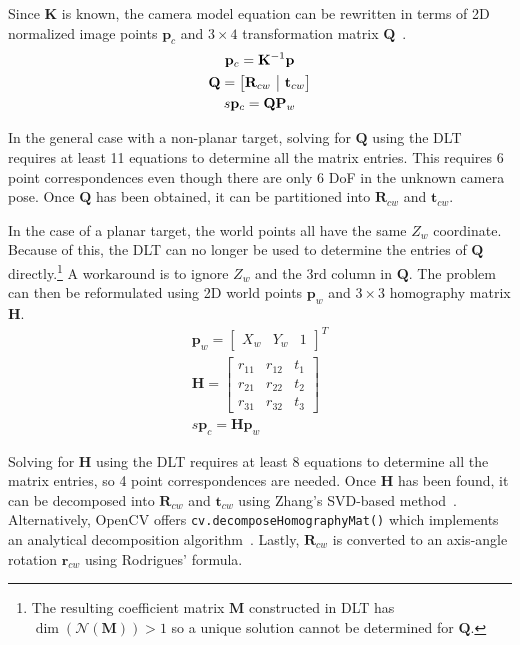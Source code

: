 \documentclass{article}
\makeatletter
\newcommand{\onebytwo}[2]{\ensuremath{\left[\begin{array}{@{}c|c@{}} #1 & #2 \end{array}\right]}}
\makeatother
\begin{document}
Since $\mathbf{K}$ is known, the camera model equation can be rewritten in terms of 2D normalized image points $\mathbf{p}_c$ and $3 \times 4$ transformation matrix $\mathbf{Q}$~\cite{dlt}.
\begin{gather*}
    \mathbf{p}_c=\mathbf{K}^{-1}\mathbf{p} \\
    \mathbf{Q}=\onebytwo{\mathbf{R}_{cw}}{\mathbf{t}_{cw}} \\
    s\mathbf{p}_c=\mathbf{Q}\mathbf{P}_w
\end{gather*}

In the general case with a non-planar target, solving for $\mathbf{Q}$ using the DLT requires at least 11 equations to determine all the matrix entries. This requires 6 point correspondences even though there are only 6 DoF in the unknown camera pose.\footnotemark{} Once $\mathbf{Q}$ has been obtained, it can be partitioned into $\mathbf{R}_{cw}$ and $\mathbf{t}_{cw}$.


In the case of a planar target, the world points all have the same $Z_w$ coordinate. Because of this, the DLT can no longer be used to determine the entries of $\mathbf{Q}$ directly.\footnote{The resulting coefficient matrix $\mathbf{M}$ constructed in DLT has $\dim (\mathcal{N} ( \mathbf{M} ) ) > 1$ so a unique solution cannot be determined for $\mathbf{Q}$.} A workaround is to ignore $Z_w$ and the 3rd column in $\mathbf{Q}$. The problem can then be reformulated using 2D world points $\mathbf{p}_w$ and $3 \times 3$ homography matrix $\mathbf{H}$.
\begin{gather*}
    \mathbf{p}_w=\begin{bmatrix}X_w & Y_w & 1\end{bmatrix}^T \\
    \mathbf{H} = \begin{bmatrix} r_{11} & r_{12} & t_{1} \\ r_{21} & r_{22} & t_{2} \\ r_{31} & r_{32} & t_{3} \end{bmatrix} \\
    s\mathbf{p}_c=\mathbf{H}\mathbf{p}_w
\end{gather*}

Solving for $\mathbf{H}$ using the DLT requires at least 8 equations to determine all the matrix entries, so 4 point correspondences are needed. Once $\mathbf{H}$ has been found, it can be decomposed into $\mathbf{R}_{cw}$ and $\mathbf{t}_{cw}$ using Zhang's SVD-based method~\cite{zhang}. Alternatively, OpenCV offers \verb|cv.decomposeHomographyMat()| which implements an analytical decomposition algorithm~\cite{malis2007deeper}. Lastly, $\mathbf{R}_{cw}$ is converted to an axis-angle rotation $\mathbf{r}_{cw}$ using Rodrigues' formula.
\end{document}
